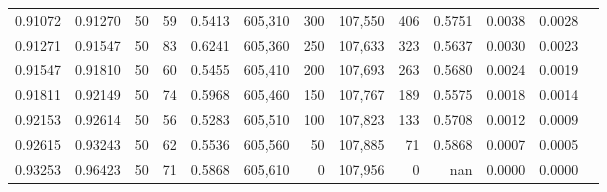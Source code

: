 \begin{tabular}{rrrrrrrrrrrrr}
0.91072 & 0.91270 &    50 &  59 &                                     0.5413 & 605,310 &     300 & 107,550 &     406 & 0.5751 & 0.0038 & 0.0028 \\
0.91271 & 0.91547 &    50 &  83 &                                     0.6241 & 605,360 &     250 & 107,633 &     323 & 0.5637 & 0.0030 & 0.0023 \\
0.91547 & 0.91810 &    50 &  60 &                                     0.5455 & 605,410 &     200 & 107,693 &     263 & 0.5680 & 0.0024 & 0.0019 \\
0.91811 & 0.92149 &    50 &  74 &                                     0.5968 & 605,460 &     150 & 107,767 &     189 & 0.5575 & 0.0018 & 0.0014 \\
0.92153 & 0.92614 &    50 &  56 &                                     0.5283 & 605,510 &     100 & 107,823 &     133 & 0.5708 & 0.0012 & 0.0009 \\
0.92615 & 0.93243 &    50 &  62 &                                     0.5536 & 605,560 &      50 & 107,885 &      71 & 0.5868 & 0.0007 & 0.0005 \\
0.93253 & 0.96423 &    50 &  71 &                                     0.5868 & 605,610 &       0 & 107,956 &       0 &    nan & 0.0000 & 0.0000 \\
\bottomrule
\end{tabular}
